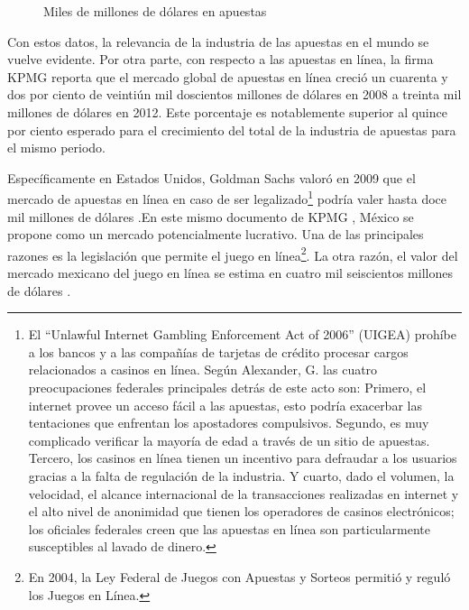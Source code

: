 \begin{figure}[!htb]\centering
   \begin {minipage}{0.85\textwidth}
     \caption{Miles de millones de dólares en apuestas}\label{Fig:gasto-apuestas}
   \end{minipage}
\end{figure}

Con estos datos, la relevancia de la industria de las apuestas en el mundo se vuelve evidente.  Por otra parte, con respecto a las apuestas en línea, la firma KPMG \cite{kpmgOnlineGaming} reporta que el mercado global de apuestas en línea creció un cuarenta y dos por ciento de veintiún mil doscientos millones de dólares en 2008 a treinta mil millones de dólares en 2012. Este porcentaje es notablemente superior al quince por ciento esperado para el crecimiento del total de la industria de apuestas para el mismo periodo. 

Específicamente en Estados Unidos, Goldman Sachs valoró en 2009 que el mercado de apuestas en línea en caso de ser legalizado\footnote{El ``Unlawful Internet Gambling Enforcement Act of 2006'' (UIGEA)  prohíbe a los bancos y a las compañías de tarjetas de crédito procesar cargos relacionados a casinos en línea. Según Alexander, G. \cite{alexander2008us} las cuatro preocupaciones federales principales detrás de este acto son: Primero, el internet provee un acceso fácil a las apuestas, esto podría exacerbar las tentaciones que enfrentan los apostadores compulsivos. Segundo, es muy complicado verificar la mayoría de edad a través de un sitio de apuestas. Tercero, los casinos en línea tienen un incentivo para defraudar a los usuarios gracias a la falta de regulación de la industria. Y cuarto, dado el volumen, la velocidad, el alcance internacional de la transacciones realizadas en internet y el alto nivel de anonimidad que tienen los operadores de casinos electrónicos; los oficiales federales creen que las apuestas en línea son particularmente susceptibles al lavado de dinero.} podría valer hasta doce mil millones de dólares \cite{goldmanParty}.En este mismo documento de KPMG \cite{kpmgOnlineGaming}, México se propone como un mercado potencialmente lucrativo. Una de las principales razones es la legislación que permite el juego en línea\footnote{En 2004, la Ley Federal de Juegos con Apuestas y Sorteos permitió y reguló los Juegos en Línea.}. La otra razón, el valor del mercado mexicano del juego en línea se estima en cuatro mil seiscientos millones de dólares \cite{yogonet}.

